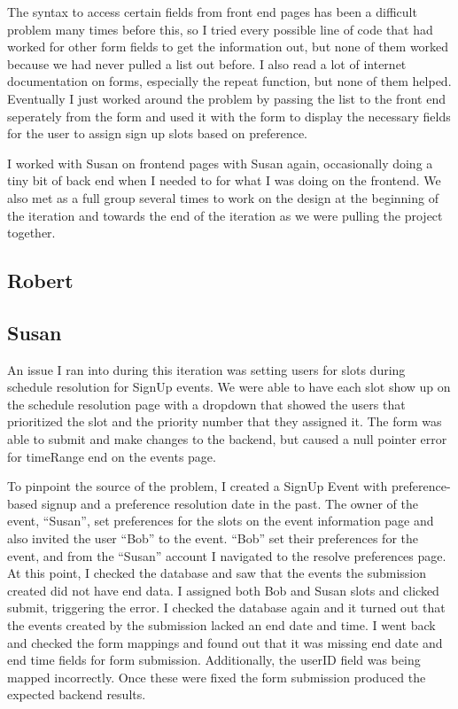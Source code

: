 \documentclass{article}
\begin{document}
The syntax to access certain fields from front end pages has been a difficult problem many times before this, so I tried every possible line of code that had worked for other form fields to get the information out, but none of them worked because we had never pulled a list out before.  I also read a lot of internet documentation on forms, especially the repeat function, but none of them helped.  Eventually I just worked around the problem by passing the list to the front end seperately from the form and used it with the form to display the necessary fields for the user to assign sign up slots based on preference.

I worked with Susan on frontend pages with Susan again, occasionally doing a tiny bit of back end when I needed to for what I was doing on the frontend.  We also met as a full group several times to work on the design at the beginning of the iteration and towards the end of the iteration as we were pulling the project together.

\subsection{Robert}


\subsection{Susan}
An issue I ran into during this iteration was setting users for slots during schedule resolution for SignUp events. We were able to have each slot show up on the schedule resolution page with a dropdown that showed the users that prioritized the slot and the priority number that they assigned it. The form was able to submit and make changes to the backend, but caused a null pointer error for timeRange end on the events page.

To pinpoint the source of the problem, I created a SignUp Event with preference-based signup and a preference resolution date in the past. The owner of the event, “Susan”, set preferences for the slots on the event information page and also invited the user “Bob” to the event. “Bob” set their preferences for the event, and from the “Susan” account I navigated to the resolve preferences page. At this point, I checked the database and saw that the events the submission created did not have end data. I assigned both Bob and Susan slots and clicked submit, triggering the error. I checked the database again and it turned out that the events created by the submission lacked an end date and time. I went back and checked the form mappings and found out that it was missing end date and end time fields for form submission. Additionally, the userID field was being mapped incorrectly. Once these were fixed the form submission produced the expected backend results.
\end{document}
